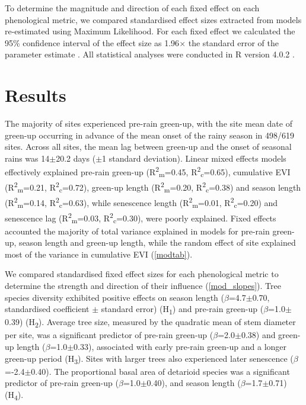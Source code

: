 \documentclass[11pt,a4paper]{article}
\begin{document}
To determine the magnitude and direction of each fixed effect on each
phenological metric, we compared standardised effect sizes extracted from
models re-estimated using Maximum Likelihood. For each fixed effect we
calculated the 95\% confidence interval of the effect size as 1.96$\times{}$
the standard error of the parameter estimate \citep{Zuur2010}. All statistical
analyses were conducted in R version 4.0.2 \citep{R2020}.

\section{Results}

The majority of sites experienced pre-rain green-up, with the site mean date of
green-up occurring in advance of the mean onset of the rainy season in 498/619
sites. Across all sites, the mean lag between green-up and the onset of
seasonal rains was 14$\pm$20.2 days ($\pm{}$1 standard deviation). Linear mixed
effects models effectively explained 
pre-rain green-up (R\textsuperscript{2}\textsubscript{m}=0.45,
R\textsuperscript{2}\textsubscript{c}=0.65), 
cumulative EVI (R\textsuperscript{2}\textsubscript{m}=0.21,
R\textsuperscript{2}\textsubscript{c}=0.72), 
green-up length (R\textsuperscript{2}\textsubscript{m}=0.20,
R\textsuperscript{2}\textsubscript{c}=0.38) and 
season length (R\textsuperscript{2}\textsubscript{m}=0.14,
R\textsuperscript{2}\textsubscript{c}=0.63), while 
senescence length (R\textsuperscript{2}\textsubscript{m}=0.01,
R\textsuperscript{2}\textsubscript{c}=0.20) and 
senescence lag (R\textsuperscript{2}\textsubscript{m}=0.03,
R\textsuperscript{2}\textsubscript{c}=0.30), were poorly explained. Fixed
effects accounted the majority of total variance explained in models for
pre-rain green-up, season length and green-up length, while the random effect
of site explained most of the variance in cumulative EVI (\autoref{modtab}).

We compared standardised fixed effect sizes for each phenological metric to
determine the strength and direction of their influence (\autoref{mod_slopes}).
Tree species diversity exhibited positive effects on season length
($\beta$=4.7$\pm$0.70, standardised coefficient $\pm$ standard error)
(H\textsubscript{1}) and pre-rain green-up ($\beta$=1.0$\pm$0.39)
(H\textsubscript{2}). Average tree size, measured by the quadratic mean of stem
diameter per site, was a significant predictor of pre-rain green-up
($\beta$=2.0$\pm$0.38) and green-up length ($\beta$=1.0$\pm$0.33), associated
with early pre-rain green-up and a longer green-up period (H\textsubscript{3}).
Sites with larger trees also experienced later senescence
($\beta$=-2.4$\pm$0.40). The proportional basal area of detarioid species was a
significant predictor of pre-rain green-up ($\beta$=1.0$\pm$0.40), and season
length ($\beta$=1.7$\pm$0.71) (H\textsubscript{4}). 
\end{document}
